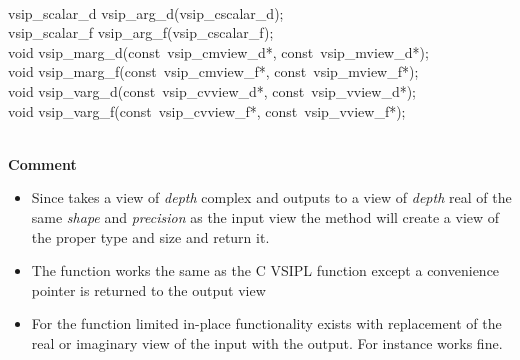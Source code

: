 \\\cvsiplh
\begin{cfuncs}
vsip\_scalar\_d vsip\_arg\_d(vsip\_cscalar\_d);\Bs\\
vsip\_scalar\_f vsip\_arg\_f(vsip\_cscalar\_f);\Bs\\
void vsip\_marg\_d(const~vsip\_cmview\_d*, const~vsip\_mview\_d*);\Bs\\
void vsip\_marg\_f(const~vsip\_cmview\_f*, const~vsip\_mview\_f*);\Bs\\
void vsip\_varg\_d(const~vsip\_cvview\_d*, const~vsip\_vview\_d*);\Bs\\
void vsip\_varg\_f(const~vsip\_cvview\_f*, const~vsip\_vview\_f*);\Bs\\
\end{cfuncs}
\pyjvsiph
{}
\\ \hspace*{.8cm}\textbf{Comment}\\
\hspace*{.8cm}\parbox{11cm}{\vspace*{.2cm}
\begin{itemize}
\item{Since  takes a view of \emph{depth} complex and outputs to a view of \emph{depth} real of the same \emph{shape} and \emph{precision} as the input view the  method will create a view of the proper type and size and return it.}
\item{The  function works the same as the C VSIPL function except a convenience pointer is returned to the output view}
\item{For the function limited in-place functionality exists with replacement of the real or imaginary view of the input with the output. For instance  works fine.}
\end{itemize}}
